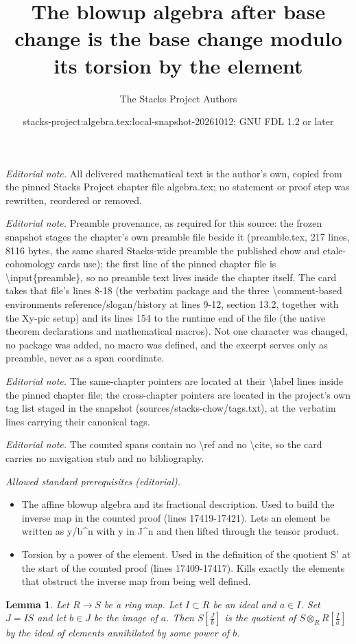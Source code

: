 \documentclass[10pt,a4paper]{amsart}
\title{The blowup algebra after base change is the base change modulo its torsion by the element}
\author{The Stacks Project Authors}
\date{stacks-project:algebra.tex:local-snapshot-20261012; GNU FDL 1.2 or later}
\theoremstyle{plain}
\newtheorem{lemma}[subsection]{Lemma}
\theoremstyle{definition}
\theoremstyle{remark}
\numberwithin{equation}{subsection}
\begin{document}
\maketitle
\noindent\textit{Editorial note.} All delivered mathematical text is the author's own, copied from the pinned Stacks Project chapter file algebra.tex; no statement or proof step was rewritten, reordered or removed.\par\medskip
\noindent\textit{Editorial note.} Preamble provenance, as required for this source: the frozen snapshot stages the chapter's own preamble file beside it (preamble.tex, 217 lines, 8116 bytes, the same shared Stacks-wide preamble the published chow and etale-cohomology cards use); the first line of the pinned chapter file is \textbackslash{}input\{preamble\}, so no preamble text lives inside the chapter itself. The card takes that file's lines 8-18 (the verbatim package and the three \textbackslash{}comment-based environments reference/slogan/history at lines 9-12, section 13.2, together with the Xy-pic setup) and its lines 154 to the runtime end of the file (the native theorem declarations and mathematical macros). Not one character was changed, no package was added, no macro was defined, and the excerpt serves only as preamble, never as a span coordinate.\par\medskip
\noindent\textit{Editorial note.} The same-chapter pointers are located at their \textbackslash{}label lines inside the pinned chapter file; the cross-chapter pointers are located in the project's own tag list staged in the snapshot (sources/stacks-chow/tags.txt), at the verbatim lines carrying their canonical tags.\par\medskip
\noindent\textit{Editorial note.} The counted spans contain no \textbackslash{}ref and no \textbackslash{}cite, so the card carries no navigation stub and no bibliography.\par\medskip
\noindent\textit{Allowed standard prerequisites (editorial).}\begin{itemize}
\item The affine blowup algebra and its fractional description. Used to build the inverse map in the counted proof (lines 17419-17421). Lets an element be written as y/b\textasciicircum{}n with y in J\textasciicircum{}n and then lifted through the tensor product.
\item Torsion by a power of the element. Used in the definition of the quotient S' at the start of the counted proof (lines 17409-17417). Kills exactly the elements that obstruct the inverse map from being well defined.
\end{itemize}\medskip
\begin{lemma}
\label{lemma-blowup-base-change}
Let $R \to S$ be a ring map. Let $I \subset R$ be an ideal
and $a \in I$. Set $J = IS$ and let $b \in J$ be the image of $a$.
Then $S[\frac{J}{b}]$ is the quotient of $S \otimes_R R[\frac{I}{a}]$
by the ideal of elements annihilated by some power of $b$.
\end{lemma}
\end{document}
